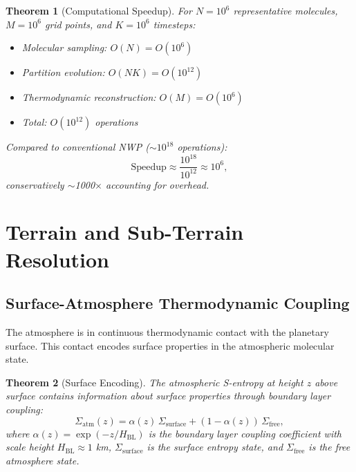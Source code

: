 \documentclass[twocolumn,10pt]{article}
\newtheorem{theorem}{Theorem}[section]
\theoremstyle{definition}
\begin{document}
\begin{theorem}[Computational Speedup]\label{thm:speedup}
For $N = 10^6$ representative molecules, $M = 10^6$ grid points, and $K = 10^6$ timesteps:
\begin{itemize}[nosep]
    \item Molecular sampling: $O(N) = O(10^6)$
    \item Partition evolution: $O(NK) = O(10^{12})$
    \item Thermodynamic reconstruction: $O(M) = O(10^6)$
    \item Total: $O(10^{12})$ operations
\end{itemize}
Compared to conventional NWP ($\sim 10^{18}$ operations):
\begin{equation}\label{eq:speedup}
    \text{Speedup} \approx \frac{10^{18}}{10^{12}} \approx 10^6,
\end{equation}
conservatively $\sim$1000$\times$ accounting for overhead.
\end{theorem}

\section{Terrain and Sub-Terrain Resolution}\label{sec:terrain}

\subsection{Surface-Atmosphere Thermodynamic Coupling}

The atmosphere is in continuous thermodynamic contact with the planetary surface. This contact encodes surface properties in the atmospheric molecular state.

\begin{theorem}[Surface Encoding]\label{thm:surface}
The atmospheric S-entropy at height $z$ above surface contains information about surface properties through boundary layer coupling:
\begin{equation}\label{eq:surface_encoding}
    \Sigma_{\mathrm{atm}}(z) = \alpha(z)\,\Sigma_{\mathrm{surface}} + (1 - \alpha(z))\,\Sigma_{\mathrm{free}},
\end{equation}
where $\alpha(z) = \exp(-z/H_{\mathrm{BL}})$ is the boundary layer coupling coefficient with scale height $H_{\mathrm{BL}} \approx 1$ km, $\Sigma_{\mathrm{surface}}$ is the surface entropy state, and $\Sigma_{\mathrm{free}}$ is the free atmosphere state.
\end{theorem}
\end{document}
